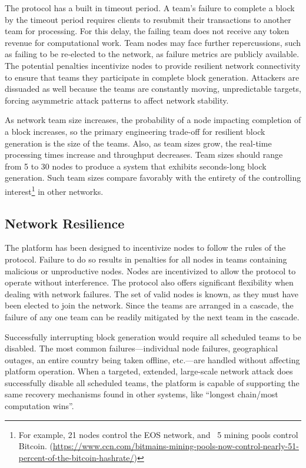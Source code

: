 The \name protocol has a built in timeout period. A team’s failure to complete a block by the timeout period requires clients to resubmit their transactions to another team for processing. For this delay, the failing team does not receive any token revenue for computational work. Team nodes may face further repercussions, such as failing to be re-elected to the network, as failure metrics are publicly available. The potential penalties incentivize nodes to provide resilient network connectivity to ensure that teams they participate in complete block generation. Attackers are dissuaded as well because the teams are constantly moving, unpredictable targets, forcing asymmetric attack patterns to affect network stability. 

As network team size increases, the probability of a node impacting completion of a block increases, so the primary engineering trade-off for resilient block generation is the size of the teams. Also, as team sizes grow, the real-time processing times increase and throughput decreases. Team sizes should range from 5 to 30 nodes to produce a system that exhibits seconds-long block generation. Such team sizes compare favorably with the entirety of the controlling interest\footnote{For example, 21 nodes control the EOS network, and ~5 mining pools control Bitcoin. (\url{https://www.ccn.com/bitmains-mining-pools-now-control-nearly-51-percent-of-the-bitcoin-hashrate/})} in other networks.

\subsection{Network Resilience}

The \name platform has been designed to incentivize nodes to follow the rules of the protocol. Failure to do so results in penalties for all nodes in teams containing malicious or unproductive nodes. Nodes are incentivized to allow the protocol to operate without interference. The protocol also offers significant flexibility when dealing with network failures. The set of valid nodes is known, as they must have been elected to join the network. Since the teams are arranged in a cascade, the failure of any one team can be readily mitigated by the next team in the cascade.

Successfully interrupting block generation would require all scheduled teams to be disabled. The most common failures---individual node failures, geographical outages, an entire country being taken offline, etc.---are handled without affecting platform operation. When a targeted, extended, large-scale network attack does successfully disable all scheduled teams, the platform is capable of supporting the same recovery mechanisms found in other systems, like “longest chain/most computation wins”.

